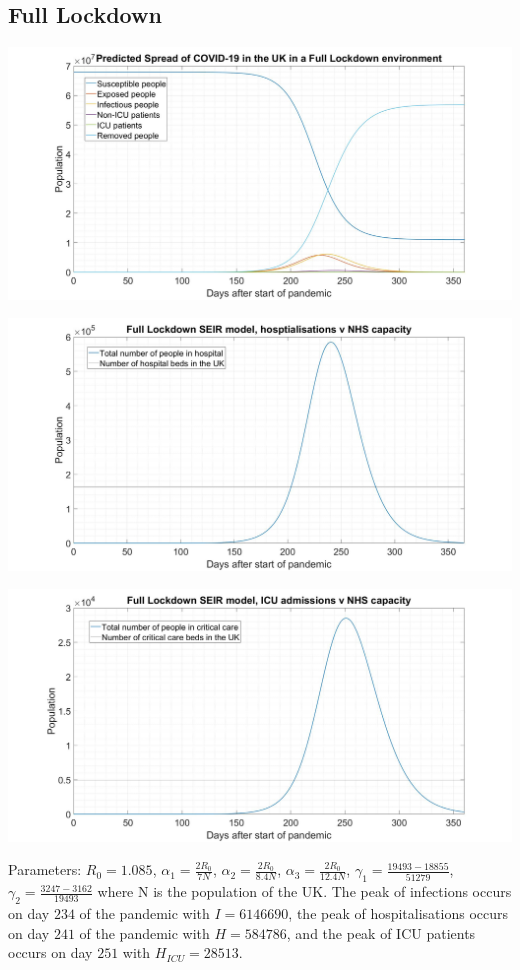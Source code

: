 \documentclass[11pt]{article}
\begin{document}
\subsection{Full Lockdown}
\begin{center}
\includegraphics[width=1\textwidth]{FLSEIHR.jpg} 

\includegraphics[width=1\textwidth]{FLH.jpg} 

\includegraphics[width=1\textwidth]{FLHICU.jpg} 
\end{center}
Parameters: $R_0=1.085$, $\alpha_1=\frac{2R_0}{7N}$, $\alpha_2=\frac{2R_0}{8.4N}$, $\alpha_3=\frac{2R_0}{12.4N}$, $\gamma_1=\frac{19493-18855}{51279}$, $\gamma_2=\frac{3247-3162}{19493}$ where N is the population of the UK. The peak of infections occurs on day $234$ of the pandemic with $I=6146690$, the peak of hospitalisations occurs on day $241$ of the pandemic with $H=584786$, and the peak of ICU patients occurs on day $251$ with $H_{ICU}=28513$. \par 
\end{document}
